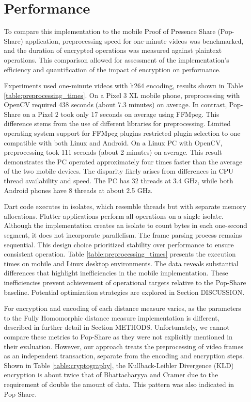 \section{Performance}

To compare this implementation to the mobile Proof of Presence Share (Pop-Share) application, preprocessing speed for one-minute videos was benchmarked, and the duration of encrypted operations was measured against plaintext operations. This comparison allowed for assessment of the implementation's efficiency and quantification of the impact of encryption on performance.



Experiments used one-minute videos with h264 encoding, results shown in Table \ref{table:preprocessing_times}. On a Pixel 3 XL mobile phone, preprocessing with OpenCV required 438 seconds (about 7.3 minutes) on average. In contrast, Pop-Share on a Pixel 2 took only 17 seconds on average using FFMpeg. This difference stems from the use of different libraries for preprocessing. Limited operating system support for FFMpeg plugins restricted plugin selection to one compatible with both Linux and Android. On a Linux PC with OpenCV, preprocessing  took 111 seconds (about 2 minutes) on average. This result demonstrates the PC operated approximately four times faster than the average of the two mobile devices. The disparity likely arises from differences in CPU thread availability and speed. The PC has 32 threads at 3.4 GHz, while both Android phones have 8 threads at about 2.5 GHz.

Dart code executes in isolates, which resemble threads but with separate memory allocations. Flutter applications perform all operations on a single isolate. Although the implementation creates an isolate to count bytes in each one-second segment, it does not incorporate parallelism. The frame parsing process remains sequential. This design choice prioritized stability over performance to ensure consistent operation. Table \ref{table:preprocessing_times} presents the execution times on mobile and Linux desktop environments. The data reveals substantial differences that highlight inefficiencies in the mobile implementation. These inefficiencies prevent achievement of operational targets relative to the Pop-Share baseline. Potential optimization strategies are explored in Section DISCUSSION.

For encryption and encoding of each distance measure varies, as the parameters to the Fully Homomorphic distance measure implementation is different, described in further detail in Section METHODS. Unfortunately, we cannot compare these metrics to Pop-Share as they were not explicitly mentioned in their evaluation. However, our approach treats the preprocessing of video frames as an independent transaction, separate from the encoding and encryption steps. Shown in Table \ref{table:cryptography}, the Kullback-Leibler Divergence (KLD) encryption is about twice that of Bhattacharyya and Cramer due to the requirement of double the amount of data. This pattern was also indicated in Pop-Share.


